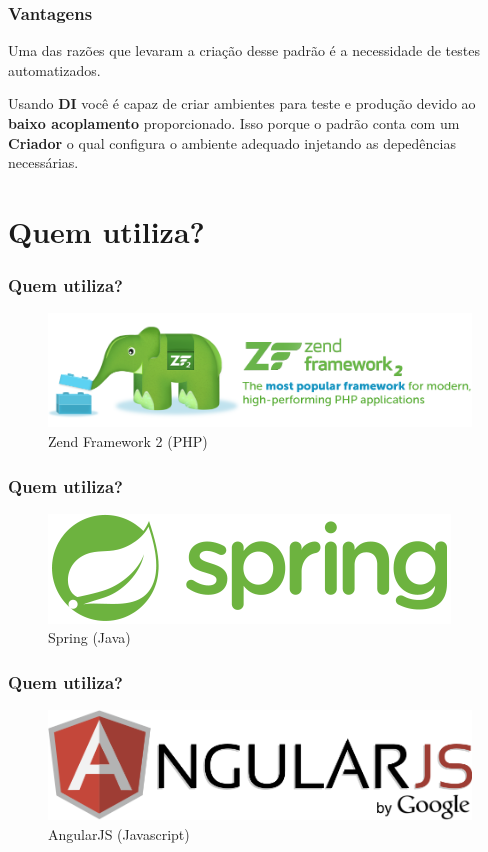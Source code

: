 \begin{frame}\frametitle{Vantagens}

Uma das razões que levaram a criação desse padrão é a necessidade de
testes automatizados.

Usando \textbf{DI} você é capaz de criar ambientes para teste e produção
devido ao \textbf{baixo acoplamento} proporcionado. Isso porque o padrão
conta com um \textbf{Criador} o qual configura o ambiente adequado
injetando as depedências necessárias.

\end{frame}

\section{Quem utiliza?}

\begin{frame}\frametitle{Quem utiliza?}

\begin{figure}
    \includegraphics[scale=0.3]{img/zend2.png}
    \caption{Zend Framework 2 (PHP)}
\end{figure}

\end{frame}

\begin{frame}\frametitle{Quem utiliza?}

\begin{figure}
    \includegraphics[scale=0.4]{img/oss-logo-spring.png}
    \caption{Spring (Java)}
\end{figure}

\end{frame}

\begin{frame}\frametitle{Quem utiliza?}

\begin{figure}
    \includegraphics[scale=0.4]{img/angularjs-logo.png}
    \caption{AngularJS (Javascript)}
\end{figure}

\end{frame}

